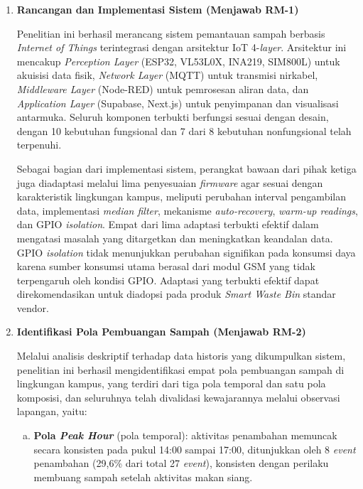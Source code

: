 \begin{enumerate}
  \item \textbf{Rancangan dan Implementasi Sistem (Menjawab RM-1)}

  Penelitian ini berhasil merancang sistem pemantauan sampah berbasis \textit{Internet of Things} terintegrasi dengan arsitektur IoT 4-\textit{layer}. Arsitektur ini mencakup \textit{Perception Layer} (ESP32, VL53L0X, INA219, SIM800L) untuk akuisisi data fisik, \textit{Network Layer} (MQTT) untuk transmisi nirkabel, \textit{Middleware Layer} (Node-RED) untuk pemrosesan aliran data, dan \textit{Application Layer} (Supabase, Next.js) untuk penyimpanan dan visualisasi antarmuka. Seluruh komponen terbukti berfungsi sesuai dengan desain, dengan 10 kebutuhan fungsional dan 7 dari 8 kebutuhan nonfungsional telah terpenuhi.

  Sebagai bagian dari implementasi sistem, perangkat bawaan dari pihak ketiga juga diadaptasi melalui lima penyesuaian \textit{firmware} agar sesuai dengan karakteristik lingkungan kampus, meliputi perubahan interval pengambilan data, implementasi \textit{median filter}, mekanisme \textit{auto-recovery}, \textit{warm-up readings}, dan GPIO \textit{isolation}. Empat dari lima adaptasi terbukti efektif dalam mengatasi masalah yang ditargetkan dan meningkatkan keandalan data. GPIO \textit{isolation} tidak menunjukkan perubahan signifikan pada konsumsi daya karena sumber konsumsi utama berasal dari modul GSM yang tidak terpengaruh oleh kondisi GPIO. Adaptasi yang terbukti efektif dapat direkomendasikan untuk diadopsi pada produk \textit{Smart Waste Bin} standar vendor.

  \item \textbf{Identifikasi Pola Pembuangan Sampah (Menjawab RM-2)}

  Melalui analisis deskriptif terhadap data historis yang dikumpulkan sistem, penelitian ini berhasil mengidentifikasi empat pola pembuangan sampah di lingkungan kampus, yang terdiri dari tiga pola temporal dan satu pola komposisi, dan seluruhnya telah divalidasi kewajarannya melalui observasi lapangan, yaitu:

  \begin{enumerate}[a.]
    \item \textbf{Pola \textit{Peak Hour}} (pola temporal): aktivitas penambahan memuncak secara konsisten pada pukul 14:00 sampai 17:00, ditunjukkan oleh 8 \textit{event} penambahan (29,6\% dari total 27 \textit{event}), konsisten dengan perilaku membuang sampah setelah aktivitas makan siang.


\end{enumerate}
\end{enumerate}
